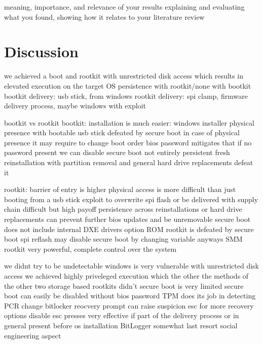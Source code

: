 

meaning, importance, and relevance of your results
explaining and evaluating what you found, showing how it relates to your literature review

\chapter{Discussion}

we achieved a boot and rootkit with unrestricted disk access which results in elevated execution on the target OS
persistence with rootkit/none with bootkit
bootkit delivery:
usb stick, from windows
rootkit delivery:
spi clamp, firmware delivery process, maybe windows with exploit

bootkit vs rootkit
bootkit:
installation is much easier:
windows installer
physical presence with bootable usb stick
defeated by secure boot
in case of physical presence it may require to change boot order
bios password mitigates that
if no password present we can disable secure boot
not entirely persistent
fresh reinstallation with partition removal and general hard drive replacements defeat it

rootkit:
barrier of entry is higher
physical access is more difficult than just booting from a usb stick
exploit to overwrite spi flash or be delivered with supply chain difficult
but high payoff
persistence across reinstallations or hard drive replacements
can prevent further bios updates and be unremovable
secure boot does not include internal DXE drivers
option ROM rootkit is defeated by secure boot
spi reflash may disable secure boot by changing variable anyways
SMM rootkit very powerful, complete control over the system


we didnt try to be undetectable
windows is very vulnerable with unrestricted disk access
we achieved highly priveleged execution which the other the methods of the other two storage based rootkits didn't
secure boot is very limited
secure boot can easily be disabled without bios password
TPM does its job in detecting PCR change
bitlocker reocvery prompt can raise suspicion
esc for more recovery options
disable esc presses
very effective if part of the delivery process or in general present before os installation
BitLogger somewhat last resort
social engineering aspect

